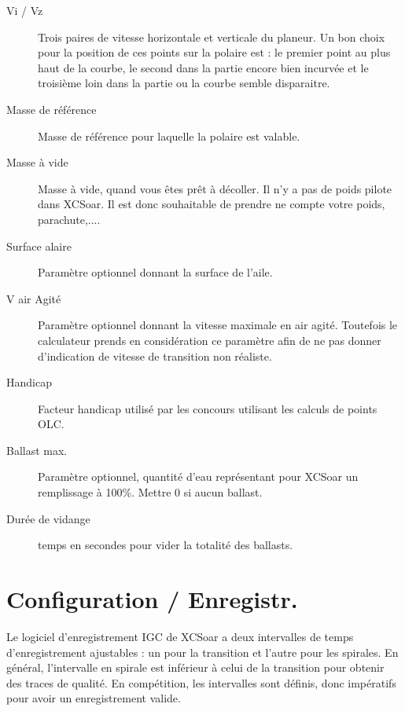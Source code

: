 \begin{description}
\item[Vi / Vz]  Trois paires de vitesse horizontale et verticale du planeur. Un bon choix pour la position de ces points sur la polaire est : le premier point au plus haut de la courbe, le second dans la partie encore bien incurvée et le troisième loin dans la partie ou la courbe semble disparaitre.
\item[Masse de référence]  Masse de référence pour laquelle la polaire est valable.
\item[Masse à vide]  Masse à vide, quand vous êtes prêt à décoller. Il n'y a pas de poids pilote dans XCSoar. Il est donc souhaitable de prendre ne compte votre poids, parachute,....
\item[Surface alaire]  Paramètre optionnel donnant la surface de l'aile.
\item[V air Agité] Paramètre optionnel donnant la vitesse maximale en air agité. Toutefois le calculateur prends en considération ce paramètre afin de ne pas donner d'indication de vitesse de transition non réaliste.
\item[Handicap]  Facteur handicap utilisé par les concours utilisant les calculs de points OLC.
\item[Ballast max.]  Paramètre optionnel, quantité d'eau représentant pour XCSoar un remplissage à 100\%. Mettre 0 si aucun ballast.
\item[Durée de vidange]  temps en secondes pour vider la totalité des ballasts.
\end{description}


\section{Configuration / Enregistr.} \label{conf:logger}

Le logiciel d'enregistrement IGC de XCSoar a deux intervalles de temps d'enregistrement ajustables : un pour la transition et l'autre pour les spirales. En général, l'intervalle en spirale est inférieur à celui de la transition pour obtenir des traces de qualité. En compétition, les intervalles sont définis, donc impératifs pour avoir un enregistrement valide.

